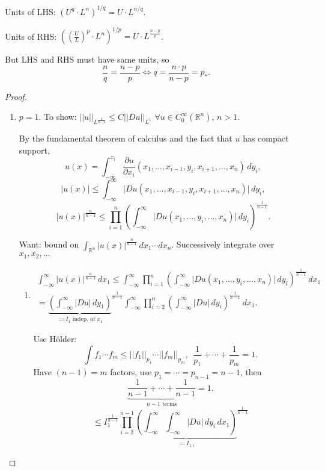 \documentclass[12pt]{article}
\theoremstyle{definition}
\begin{document}
Units of LHS: $(U^q\cdot L^n)^{1/q}=U\cdot L^{n/q}$.

Units of RHS: $((\frac{U}{L})^p\cdot L^n)^{1/p}=U\cdot L^{\frac{n-p}{p}}$.

But LHS and RHS must have same units, so
\begin{equation}\tag{Sobolev exponent}
\frac{n}{q}=\frac{n-p}{p}\Longleftrightarrow q=\frac{n\cdot p}{n-p}=p_*.
\end{equation}

\begin{proof}
\begin{enumerate}[label=\alph*)]
\item $p=1$. To show: $||u||_{L^{\frac{n}{n-1}}}\leq C||Du||_{L^1}$ $\forall u\in C_0^{\infty}(\mathbb{R}^n)$, $n>1$.

By the fundamental theorem of calculus and the fact that $u$ has compact support,
\[u(x)=\int_{-\infty}^{x_i}\frac{\partial u}{\partial x_i}(x_1,\ldots,x_{i-1},y_i,x_{i+1},\ldots,x_n)\,dy_i,\]
\[|u(x)|\leq\int_{-\infty}^{\infty}\big|Du(x_1,\ldots,x_{i-1},y_i,x_{i+1},\ldots,x_n)\big|\,dy_i,\]
\[|u(x)|^{\frac{n}{n-1}}\leq\prod_{i=1}^n\left(\int_{-\infty}^{\infty}\big|Du(x_1,\ldots,y_i,\ldots,x_n)\big|\,dy_i\right)^{\frac{1}{n-1}}.\]

Want: bound on $\int_{\mathbb{R}^n}|u(x)|^{\frac{n}{n-1}}\,dx_1\cdots dx_n$. Successively integrate over $x_1,x_2,\ldots$

\begin{enumerate}[label=\arabic*.]
\item
\begin{multline*}
\int_{-\infty}^{\infty}|u(x)|^{\frac{n}{n-1}}\,dx_1\leq\int_{-\infty}^{\infty}\prod_{i=1}^n\left(\int_{-\infty}^{\infty}\big|Du(x_1,\ldots,y_i,\ldots,x_n)\big|\,dy_i\right)^{\frac{1}{n-1}}\,dx_1\\
={\underbrace{\left(\int_{-\infty}^{\infty}|Du|\,dy_1\right)}_{\eqqcolon I_1\text{ indep. of }x_1}}^{\frac{1}{n-1}}\int_{-\infty}^{\infty}\prod_{i=2}^n\left(\int_{-\infty}^{\infty}|Du|\,dy_i\right)^{\frac{1}{n-1}}\,dx_1.
\end{multline*}

Use H\"{o}lder:
\[\int f_1\cdots f_m\leq||f_1||_{p_1}\cdots||f_m||_{p_m},\ \ \frac{1}{p_1}+\cdots+\frac{1}{p_m}=1.\]
Have $(n-1)=m$ factors, use $p_1=\cdots=p_{n-1}=n-1$, then
\[\underbrace{\frac{1}{n-1}+\cdots+\frac{1}{n-1}}_{n-1\text{ terms}}=1.\]
\[\leq I_1^{\frac{1}{n-1}}\prod_{i=2}^{n-1}{\underbrace{\left(\int_{-\infty}^{\infty}\int_{-\infty}^{\infty}|Du|\,dy_i\,dx_1\right)}_{\eqqcolon I_{1,i}}}^{\frac{1}{n-1}}\]


\end{enumerate}
\end{enumerate}
\end{proof}
\end{document}
